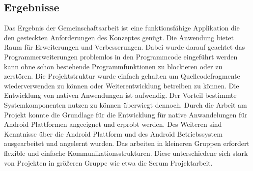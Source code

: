 \subsection{Ergebnisse}
Das Ergebnis der Gemeinschaftsarbeit ist eine funktionsfähige Applikation die den gesteckten Anforderungen des Konzeptes genügt. Die Anwendung bietet Raum für Erweiterungen und Verbesserungen. Dabei wurde darauf geachtet das Programmerweiterungen problemlos in den Programmcode eingeführt werden kann ohne schon bestehende Programmfunktionen zu blockieren oder zu zerstören.
Die Projektstruktur wurde einfach gehalten um Quellcodefragmente wiederverwenden zu können oder Weiterentwicklung betreiben zu können. Die Entwicklung von nativen Anwendungen ist aufwendig. Der Vorteil bestimmte Systemkomponenten nutzen zu können überwiegt dennoch.
Durch die Arbeit am Projekt konnte die Grundlage für die Entwicklung für native Anwandelungen für Android Plattformen angeeignet und erprobt werden. Des Weiteren sind Kenntnisse über die Android Plattform und des Android Betriebssystem ausgearbeitet und angelernt wurden. Das arbeiten in kleineren Gruppen erfordert flexible und einfache Kommunikationsstrukturen. Diese unterschiedene sich stark von Projekten in größeren Gruppe wie etwa die Scrum\cite{9783868998337} Projektarbeit.